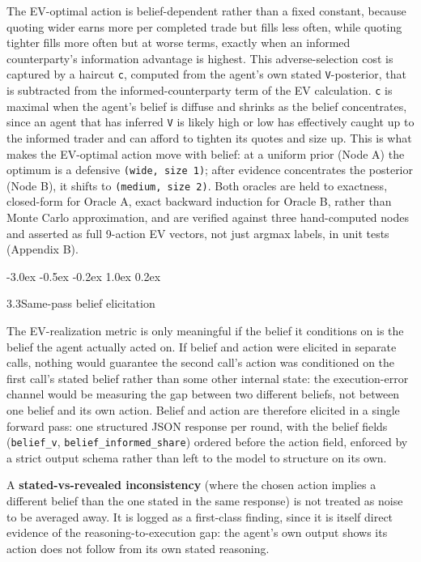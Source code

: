 \documentclass[
  11pt,
]{article}
\makeatletter
\renewcommand{\subsection}{%
  \@startsection{subsection}{2}{\z@}%
                {-3.0ex \@plus -0.5ex \@minus -0.2ex}%
                { 1.0ex \@plus  0.2ex}%
                {\normalsize\bf\raggedright}%
}
\makeatother
\begin{document}
The EV-optimal action is belief-dependent rather than a fixed constant, because quoting wider earns more per completed trade but fills less often, while quoting tighter fills more often but at worse terms, exactly when an informed counterparty's information advantage is highest. This adverse-selection cost is captured by a haircut \texttt{c}, computed from the agent's own stated \texttt{V}-posterior, that is subtracted from the informed-counterparty term of the EV calculation. \texttt{c} is maximal when the agent's belief is diffuse and shrinks as the belief concentrates, since an agent that has inferred \texttt{V} is likely high or low has effectively caught up to the informed trader and can afford to tighten its quotes and size up. This is what makes the EV-optimal action move with belief: at a uniform prior (Node A) the optimum is a defensive \texttt{(wide,\ size\ 1)}; after evidence concentrates the posterior (Node B), it shifts to \texttt{(medium,\ size\ 2)}. Both oracles are held to exactness, closed-form for Oracle A, exact backward induction for Oracle B, rather than Monte Carlo approximation, and are verified against three hand-computed nodes and asserted as full 9-action EV vectors, not just argmax labels, in unit tests (Appendix B).

\subsection{3.3\quad Same-pass belief elicitation}\label{same-pass-belief-elicitation}

The EV-realization metric is only meaningful if the belief it conditions on is the belief the agent actually acted on. If belief and action were elicited in separate calls, nothing would guarantee the second call's action was conditioned on the first call's stated belief rather than some other internal state: the execution-error channel would be measuring the gap between two different beliefs, not between one belief and its own action. Belief and action are therefore elicited in a single forward pass: one structured JSON response per round, with the belief fields (\texttt{belief\_v}, \texttt{belief\_informed\_share}) ordered before the action field, enforced by a strict output schema rather than left to the model to structure on its own.

A \textbf{stated-vs-revealed inconsistency} (where the chosen action implies a different belief than the one stated in the same response) is not treated as noise to be averaged away. It is logged as a first-class finding, since it is itself direct evidence of the reasoning-to-execution gap: the agent's own output shows its action does not follow from its own stated reasoning.
\end{document}
